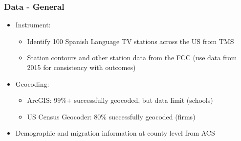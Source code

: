\documentclass{beamer}
\begin{document}
\begin{frame}
\frametitle{Data - General}

\begin{itemize}
\item Instrument:
\begin{itemize}
\item Identify 100 Spanish Language TV stations across the US from TMS
\item Station contours and other station data from the FCC (use data from 2015 for consistency with outcomes)
\end{itemize}
\item Geocoding:
\begin{itemize}
\item ArcGIS: 99\%+ successfully geocoded, but data limit (schools)
\item US Census Geocoder: 80\% successfully geocoded (firms)
\end{itemize}
\item Demographic and migration information at county level from ACS
\end{itemize}

\end{frame}
\end{document}

